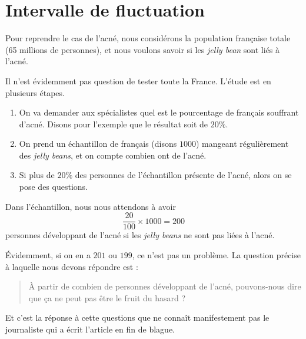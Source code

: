


\section{Intervalle de fluctuation}

Pour reprendre le cas de l'acné, nous considérons la population française totale (65 millions de personnes), et nous voulons savoir si les \emph{jelly bean} sont liés à l'acné.

Il n'est évidemment pas question de tester toute la France. L'étude est en plusieurs étapes.
\begin{enumerate}
    \item
        On va demander aux spécialistes quel est le pourcentage de français souffrant d'acné. Disons pour l'exemple que le résultat soit de \( 20\%\).
    \item
        On prend un échantillon de français (disons \( 1000\)) mangeant régulièrement des \emph{jelly beans}, et on compte combien ont de l'acné.
    \item
        Si plus de \( 20\%\) des personnes de l'échantillon présente de l'acné, alors on se pose des questions.
\end{enumerate}

Dans l'échantillon, nous nous attendons à avoir 
\begin{equation}
    \frac{ 20 }{ 100 }\times 1000=200
\end{equation}
personnes développant de l'acné si les \emph{jelly beans} ne sont pas liées à l'acné. 

Évidemment, si on en a \( 201\) ou \( 199\), ce n'est pas un problème. La question précise à laquelle nous devons répondre est :
\begin{quote}
    À partir de combien de personnes développant de l'acné, pouvons-nous dire que ça ne peut pas être le fruit du hasard ?
\end{quote}
Et c'est la réponse à cette questions que ne connaît manifestement pas le journaliste qui a écrit l'article en fin de blague.


